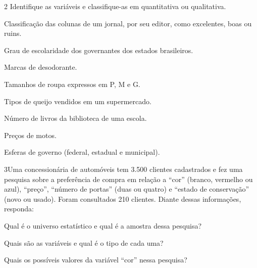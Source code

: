\num{2} Identifique as variáveis e classifique-as em quantitativa 
ou qualitativa.

\begin{escolha}
\item
  Classificação das colunas de um jornal, por seu editor, como
  excelentes, boas ou ruins.\\

\item
  Grau de escolaridade dos governantes dos estados brasileiros.\\

\item
  Marcas de desodorante.\\

\item
  Tamanhos de roupa expressos em P, M e G.\\

\item
  Tipos de queijo vendidos em um supermercado.\\

\item
  Número de livros da biblioteca de uma escola.\\

\item
  Preços de motos.\\

\item
  Esferas de governo (federal, estadual e municipal).\\
\end{escolha}

\num{3}Uma concessionária de automóveis tem 3.500 clientes cadastrados e
fez uma pesquisa sobre a preferência de compra em relação a “cor”
(branco, vermelho ou azul), “preço”, “número de portas” (duas ou
quatro) e “estado de conservação” (novo ou usado). Foram consultados
210 clientes. Diante dessas informações, responda:

\begin{escolha}
\item
  Qual é o universo estatístico e qual é a amostra dessa pesquisa?\\

\item
  Quais são as variáveis e qual é o tipo de cada uma?\\

\item
  Quais os possíveis valores da variável “cor” nessa pesquisa?\\
\end{escolha}

